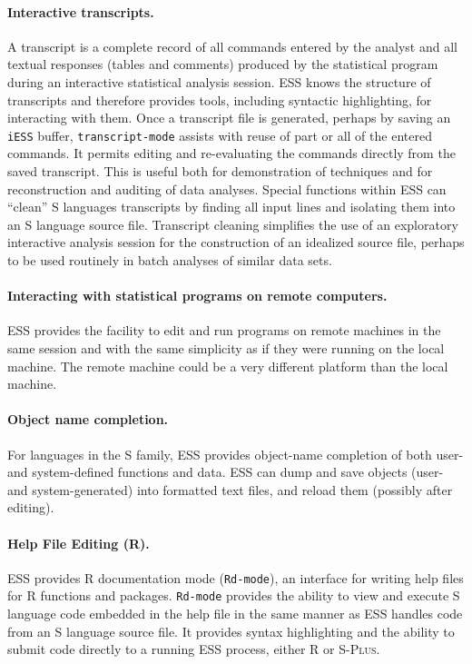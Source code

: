 \documentclass{article}
\newcommand*{\Splus}{\textsc{S-Plus}}
\newcommand{\stexttt}[1]{{\small\texttt{#1}}}
\begin{document}
\paragraph{Interactive transcripts.}
A transcript is a complete record of all commands entered by the
analyst and all textual responses (tables and comments) produced by
the statistical program during an interactive statistical analysis
session.  ESS knows the structure of transcripts and therefore
provides tools, including syntactic highlighting, for interacting with
them.  Once a transcript file is generated, perhaps by saving an
\stexttt{iESS} buffer, \stexttt{transcript-mode} assists with reuse of
part or all of the entered commands.  It permits editing and
re-evaluating the commands directly from the saved transcript.  This
is useful both for demonstration of techniques and for reconstruction
and auditing of data analyses.  Special functions within ESS can
``clean'' S languages transcripts by finding all input lines and
isolating them into an S language source file.  Transcript cleaning
simplifies the use of an exploratory interactive analysis session for
the construction of an idealized source file, perhaps to be used
routinely in batch analyses of similar data sets.

\paragraph{Interacting with statistical programs on remote computers.}
ESS provides the facility to edit and run programs on remote machines
in the same session and with the same simplicity as if they were
running on the local machine.  The remote machine could be a very
different platform than the local machine.

\paragraph{Object name completion.}
For languages in the S family,
ESS provides object-name completion of both user- and
system-defined functions and data.  ESS can dump and save objects
(user- and system-generated) into formatted text files,
and reload them (possibly after editing).

\paragraph{Help File Editing (R).}
ESS provides R documentation mode (\stexttt{Rd-mode}), an interface
for writing help files for R functions and packages.
\stexttt{Rd-mode} provides the ability to view and execute S language
code embedded in the help file in the same manner as ESS handles code
from an S language source file.  It provides syntax highlighting and
the ability to submit code directly to a running ESS process, either R or
\Splus.
\end{document}

